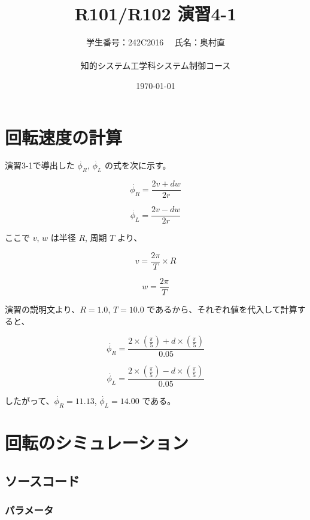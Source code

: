 \documentclass[10pt,a4paper,titlepage]{jreport} %
\title{R101/R102 演習4-1} %
\author{
  学生番号：242C2016 　氏名：奥村直 \\
  \\
  知的システム工学科システム制御コース
  } %
\date{\today} %
\begin{document}
\maketitle

\chapter{回転速度の計算}

演習3-1で導出した $\dot{\phi_R}$, $\dot{\phi_L}$ の式を次に示す。

\begin{equation}
\dot{\phi_R} = \frac{2v + dw}{2r}
\end{equation}

\begin{equation}
\dot{\phi_L} = \frac{2v - dw}{2r}
\end{equation}

ここで $v$, $w$ は半径 $R$, 周期 $T$ より、

\begin{equation}
v = \frac{2\pi}{T} \times R
\end{equation}

\begin{equation}
w = \frac{2\pi}{T}
\end{equation}

演習の説明文より、$R = 1.0$, $T = 10.0$ であるから、それぞれ値を代入して計算すると、

\begin{equation}
\dot{\phi_R} = \frac{2\times(\frac{\pi}{5}) + d\times(\frac{\pi}{5})}{0.05}
\end{equation}

\begin{equation}
\dot{\phi_L} = \frac{2\times(\frac{\pi}{5}) - d\times(\frac{\pi}{5})}{0.05}
\end{equation}

したがって、$\dot{\phi_R} = 11.13$, $\dot{\phi_L} = 14.00$ である。

\chapter{回転のシミュレーション}

\section{ソースコード}

\subsection{パラメータ}
\end{document}
